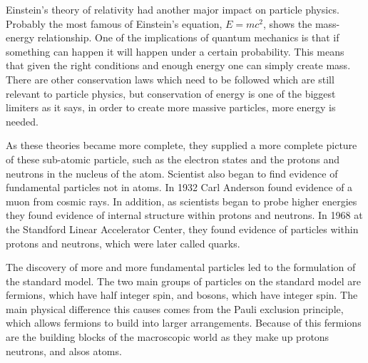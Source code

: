 Einstein's theory of relativity had another major impact on particle physics. Probably the most famous of Einstein's equation, $E = mc^2$, shows the mass-energy relationship. One of the implications of quantum mechanics is that if something can happen it will happen under a certain probability. This means that given the right conditions and enough energy one can simply create mass. There are other conservation laws which need to be followed which are still relevant to particle physics, but conservation of energy is one of the biggest limiters as it says, in order to create more massive particles, more energy is needed. 

As these theories became more complete, they supplied a more complete picture of these sub-atomic particle, such as the electron states and the protons and neutrons in the nucleus of the atom. Scientist also began to find evidence of fundamental particles not in atoms. In 1932 Carl Anderson found evidence of a muon from cosmic rays. In addition, as scientists began to probe higher energies they found evidence of internal structure within protons and neutrons. In 1968 at the Standford Linear Accelerator Center, they found evidence of particles within protons and neutrons, which were later called quarks.

The discovery of more and more fundamental particles led to the formulation of the standard model. The two main groups of particles on the standard model are fermions, which have half integer spin, and bosons, which have integer spin. The main physical difference this causes comes from the Pauli exclusion principle, which allows fermions to build into larger arrangements. Because of this fermions are the building blocks of the macroscopic world as they make up protons neutrons, and alsos atoms.   

